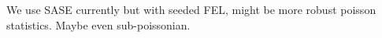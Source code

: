 We use SASE currently but with seeded FEL, might be more robust poisson statistics. Maybe even sub-poissonian.
